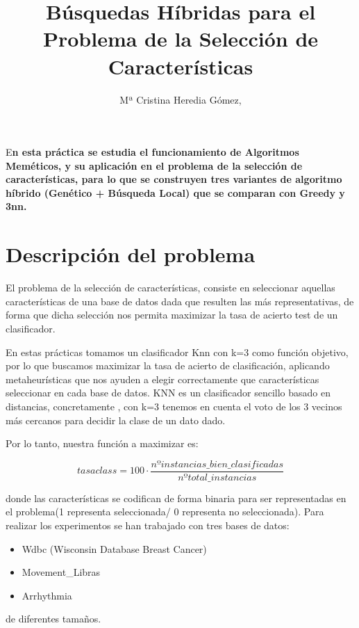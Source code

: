 \documentclass[	DIV=calc,%
							paper=a4,%
							fontsize=11pt,
							onecolumn]{scrartcl}	 					%
\title{Búsquedas Híbridas para el Problema
de la Selección de Características}	%
\author{Mª Cristina Heredia Gómez, }											%
\date{}																				%
\newcommand{\initial}[1]{%
     \lettrine[lines=3,lhang=0.3,nindent=0em]{
     				\color{DarkGoldenrod}
     				{\textsf{#1}}}{}}
\begin{document}
\maketitle
\thispagestyle{fancy} 			%
\initial{E}\textbf{n esta práctica se estudia el funcionamiento de Algoritmos Meméticos, y su aplicación en el problema de la selección de características, para lo que se construyen tres variantes de algoritmo híbrido (Genético + Búsqueda Local) que se comparan con Greedy y 3nn. }

\section*{Descripción del problema}
El problema de la selección de características, consiste en seleccionar aquellas características de una base de datos dada que resulten las más representativas, de forma que dicha selección nos permita maximizar la tasa de acierto test de un clasificador.

En estas prácticas tomamos un clasificador Knn con k=3 como función objetivo, por lo que buscamos maximizar la tasa de acierto de clasificación, aplicando metaheurísticas que nos ayuden a elegir correctamente que características seleccionar en cada base de datos. \newline
KNN es un clasificador sencillo basado en distancias, concretamente , con k=3 tenemos en cuenta el voto de los 3 vecinos más cercanos para decidir la clase de un dato dado.

Por lo tanto, nuestra función a maximizar es:

\[tasa class=100\cdot \frac{nº instancias\_bien\_clasificadas}{nº total\_instancias}\]

donde las características se codifican de forma binaria para ser representadas en el problema(1 representa seleccionada/ 0 representa no seleccionada). Para realizar los experimentos se han trabajado con tres bases de datos:

\begin{itemize}
	\item Wdbc (Wisconsin Database Breast Cancer)
	\item Movement\_Libras
	\item Arrhythmia
\end{itemize}
de diferentes tamaños.
\end{document}
